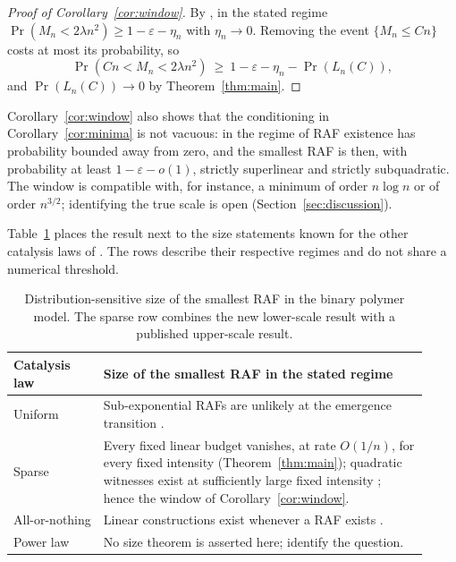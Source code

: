 \documentclass[11pt,a4paper]{article}
\theoremstyle{plain}
\theoremstyle{definition}
\theoremstyle{remark}
\begin{document}
\begin{proof}[Proof of Corollary~\ref{cor:window}]
By \cite[Corollary~2]{hordijk2016variable}, in the stated regime $\Pr(M_n<2\lambda n^2)\ge1-\varepsilon-\eta_n$ with $\eta_n\to0$. Removing the event $\{M_n\le Cn\}$ costs at most its probability, so
\[
\Pr(Cn<M_n<2\lambda n^2)\ \ge\ 1-\varepsilon-\eta_n-\Pr(L_n(C)),
\]
and $\Pr(L_n(C))\to0$ by Theorem~\ref{thm:main}.
\end{proof}

Corollary~\ref{cor:window} also shows that the conditioning in Corollary~\ref{cor:minima} is not vacuous: in the regime of \cite{hordijk2016variable} RAF existence has probability bounded away from zero, and the smallest RAF is then, with probability at least $1-\varepsilon-o(1)$, strictly superlinear and strictly subquadratic. The window is compatible with, for instance, a minimum of order $n\log n$ or of order $n^{3/2}$; identifying the true scale is open (Section~\ref{sec:discussion}).

Table~\ref{tab:comparison} places the result next to the size statements known for the other catalysis laws of \cite{hordijk2016variable}. The rows describe their respective regimes and do not share a numerical threshold.

\begin{table}[t]
\centering
\small
\begin{tabular}{@{}p{0.2\linewidth}p{0.72\linewidth}@{}}
\toprule
Catalysis law & Size of the smallest RAF in the stated regime\\
\midrule
Uniform & Sub-exponential RAFs are unlikely at the emergence transition \cite{hordijk2011required,hordijk2016variable}.\\
Sparse & Every fixed linear budget vanishes, at rate $O(1/n)$, for every fixed intensity (Theorem~\ref{thm:main}); quadratic witnesses exist at sufficiently large fixed intensity \cite[Corollary~2]{hordijk2016variable}; hence the window of Corollary~\ref{cor:window}.\\
All-or-nothing & Linear constructions exist whenever a RAF exists \cite{hordijk2016variable}.\\
Power law & No size theorem is asserted here; \cite{hordijk2014powerlaw,hordijk2016variable} identify the question.\\
\bottomrule
\end{tabular}
\caption{Distribution-sensitive size of the smallest RAF in the binary polymer model. The sparse row combines the new lower-scale result with a published upper-scale result.}
\label{tab:comparison}
\end{table}
\end{document}
